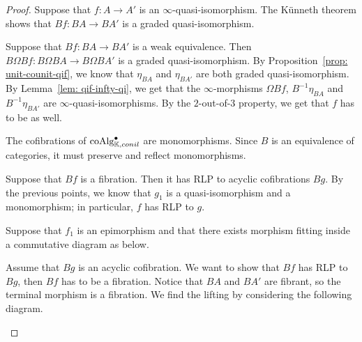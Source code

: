 \documentclass[../thesis.tex]{subfiles}
\begin{document}
        \begin{proof}
            Suppose that $f: A \rightarrow A'$ is an $\infty$-quasi-isomorphism. The K\"unneth theorem shows that $Bf: BA \rightarrow BA'$ is a graded quasi-isomorphism.

            Suppose that $Bf: BA \rightarrow BA'$ is a weak equivalence. Then $B\Omega Bf: B\Omega BA \rightarrow B\Omega BA'$ is a graded quasi-isomorphism. By Proposition~\ref{prop: unit-counit-qif}, we know that $\eta_{BA}$ and $\eta_{BA'}$ are both graded quasi-isomorphism. By Lemma~\ref{lem: qif-infty-qi}, we get that the $\infty$-morphisms $\Omega Bf$, $B^{-1}\eta_{BA}$ and $B^{-1}\eta_{BA'}$ are $\infty$-quasi-isomorphisms. By the $2$-out-of-$3$ property, we get that $f$ has to be as well.

            The cofibrations of $\tt{coAlg}_{\mathbb{K},conil}^\bullet$ are monomorphisms. Since $B$ is an equivalence of categories, it must preserve and reflect monomorphisms.

            Suppose that $Bf$ is a fibration. Then it has RLP to acyclic cofibrations $Bg$. By the previous points, we know that $g_1$ is a quasi-isomorphism and a monomorphism; in particular, $f$ has RLP to $g$.

            Suppose that $f_1$ is an epimorphism and that there exists morphism fitting inside a commutative diagram as below.
            \begin{center}
            \end{center}
            Assume that $Bg$ is an acyclic cofibration. We want to show that $Bf$ has RLP to $Bg$, then $Bf$ has to be a fibration. Notice that $BA$ and $BA'$ are fibrant, so the terminal morphism is a fibration. We find the lifting by considering the following diagram.
            \begin{center}
            \end{center}

        \end{proof}
\end{document}

